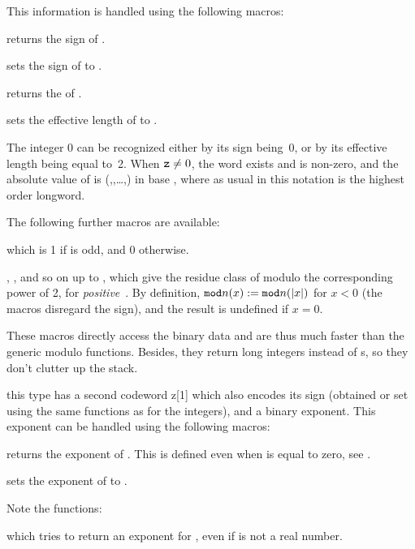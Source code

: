 \noindent This information is handled using the following macros:

 returns the sign of .

 sets the sign of  to .

 returns the  of .

 sets the effective length
of  to .

The integer 0 can be recognized either by its sign being~0, or by its
effective length being equal to~2. When ${\tt z} \ne 0$, the word
 exists and is non-zero, and the absolute value of 
is (,,\dots,) in base
, where as usual in this notation  is
the highest order longword.

\noindent The following further macros are available:

 which is 1 if  is odd, and 0 otherwise.

, , and so on up to ,
which give the residue class of  modulo the corresponding power of
2, for \emph{positive}~. By definition, ${\tt mod}n(x) :=
{\tt mod}n(|x|)$ for $x < 0$ (the macros disregard the sign), and the
result is undefined if $x = 0$.

These macros directly access the binary data and are thus much faster than
the generic modulo functions. Besides, they return long integers instead of
s, so they don't clutter up the stack.

this type has a second codeword z[1] which also encodes its sign (obtained
or set using the same functions as for the integers), and a binary
exponent. This exponent can be handled using the following macros:

 returns the exponent of .
This is defined even when  is equal to zero, see
.

 sets the exponent of  to .

\noindent Note the functions:

 which tries to return an exponent for ,
even if  is not a real number.


